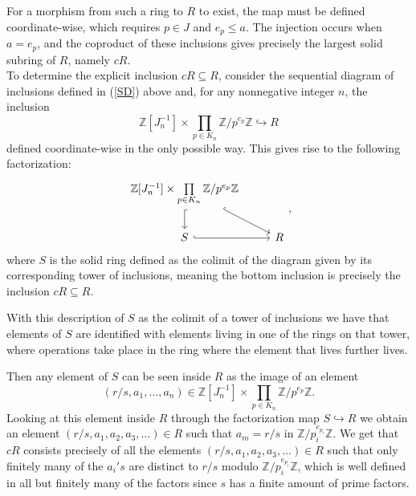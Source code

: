 \documentclass{amsart}
\newcommand{\Z}{{\mathbb Z}}
\begin{document}
    For a morphism from such a ring to $R$ to exist, the map must be defined coordinate-wise, which requires $p \in J$ and $e_p \leq a$.
    The injection occurs when $a = e_p$, and the coproduct of these inclusions gives precisely the largest solid subring of $R$, namely $cR$.\\
    
    To determine the explicit inclusion $cR \subseteq R$, consider the sequential diagram of inclusions defined in (\ref{SD}) above and, for any nonnegative integer $n$, the inclusion
    $$
    \Z[J_n^{-1}] \times \prod\limits_{p \in K_n} \Z/p^{e_p}\Z \hookrightarrow R
    $$
    defined coordinate-wise in the only possible way.
    This gives rise to the following factorization:
    $$
    \begin{tikzcd}
    {\Z[J_n^{-1}] \times \prod\limits_{p \in K_n} \Z/p^{e_p}\Z} \arrow[d, hook] \arrow[rd, hook] &   \\
    S \arrow[r, hook]                                                                            & R
    \end{tikzcd},
    $$
    where $S$ is the solid ring defined as the colimit of the diagram given by its corresponding tower of inclusions, meaning the bottom inclusion is precisely the inclusion $cR \subseteq R$.
    
    With this description of $S$ as the colimit of a tower of inclusions we have that elements of $S$ are identified with elements living in one of the rings on that tower, where operations take place in the ring where the element that lives further lives.
    
    Then any element of $S$ can be seen inside $R$ as the image of an element 
    $$
    (r/s, a_1, \dots, a_n) \in
    \Z[J_n^{-1}] \times \prod\limits_{p \in K_n} \Z/p^{e_p}\Z.
    $$
    Looking at this element inside $R$ through the factorization map $S \hookrightarrow R$ we obtain an element $(r/s, a_1, a_2, a_3, \dots) \in R$ such that $a_m = r/s$ in $\Z/p_i^{e_{p_i}}\Z$.
    We get that $cR$ consists precisely of all the elements $(r/s, a_1, a_2, a_3, \dots) \in R$ such that only finitely many of the $a_i's$ are distinct to $r/s$ modulo $\Z/p_i^{e_{p_i}}\Z$, which is well defined in all but finitely many of the factors since $s$ has a finite amount of prime factors.
    
\end{document}

